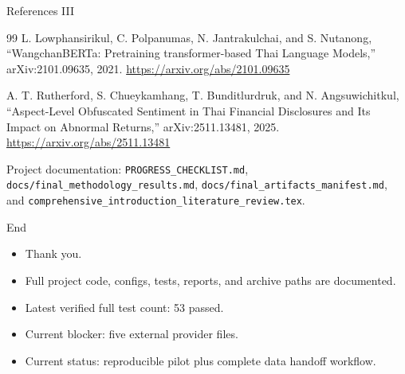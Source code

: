 \documentclass[aspectratio=43,10pt]{beamer}
\begin{document}
\begin{frame}{References III}
\scriptsize
\begin{thebibliography}{99}
L. Lowphansirikul, C. Polpanumas, N. Jantrakulchai, and S. Nutanong, ``WangchanBERTa: Pretraining transformer-based Thai Language Models,'' arXiv:2101.09635, 2021. \url{https://arxiv.org/abs/2101.09635}

A. T. Rutherford, S. Chueykamhang, T. Bunditlurdruk, and N. Angsuwichitkul, ``Aspect-Level Obfuscated Sentiment in Thai Financial Disclosures and Its Impact on Abnormal Returns,'' arXiv:2511.13481, 2025. \url{https://arxiv.org/abs/2511.13481}

Project documentation: \texttt{PROGRESS\_CHECKLIST.md}, \texttt{docs/final\_methodology\_results.md}, \texttt{docs/final\_artifacts\_manifest.md}, and \texttt{comprehensive\_introduction\_literature\_review.tex}.
\end{thebibliography}
\end{frame}

\begin{frame}{End}
\begin{itemize}
  \item Thank you.
  \item Full project code, configs, tests, reports, and archive paths are documented.
  \item Latest verified full test count: 53 passed.
  \item Current blocker: five external provider files.
  \item Current status: reproducible pilot plus complete data handoff workflow.
\end{itemize}
\end{frame}
\end{document}
